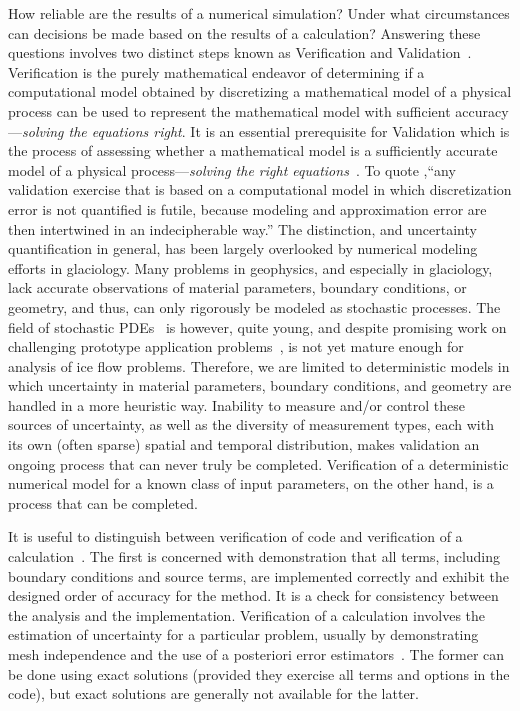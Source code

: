 How reliable are the results of a numerical simulation?
Under what circumstances can decisions be made based on the results of a calculation?
Answering these questions involves two distinct steps known as Verification and Validation~\citep{babuska2004vav,roache1998verification}.
Verification is the purely mathematical endeavor of determining if a computational model obtained by discretizing a mathematical model of a physical process can be used to represent the mathematical model with sufficient accuracy---\emph{solving the equations right}.
It is an essential prerequisite for Validation which is the process of assessing whether a mathematical model is a sufficiently accurate model of a physical process---\emph{solving the right equations}~\citep{roache1998verification}.
To quote \citet{babuska2004vav},``any validation exercise that is based on a computational model in which discretization error is not quantified is futile, because modeling and approximation error are then intertwined in an indecipherable way.''
The distinction, and uncertainty quantification in general, has been largely overlooked by numerical modeling efforts in glaciology.
Many problems in geophysics, and especially in glaciology, lack accurate observations of material parameters, boundary conditions, or geometry, and thus, can only rigorously be modeled as stochastic processes.
The field of stochastic PDEs~\citep{deb2001ssp,ghanem2003sfe,chow2007stochastic} is however, quite young, and despite promising work on challenging prototype application problems~\citep{asokan2006stochastic,ganapathysubramanian2007sgc,zabaras2008scalable,mishra2011mlmcfvm}, is not yet mature enough for analysis of ice flow problems.
Therefore, we are limited to deterministic models in which uncertainty in material parameters, boundary conditions, and geometry are handled in a more heuristic way.
Inability to measure and/or control these sources of uncertainty, as well as the diversity of measurement types, each with its own (often sparse) spatial and temporal distribution, makes validation an ongoing process that can never truly be completed.
Verification of a deterministic numerical model for a known class of input parameters, on the other hand, is a process that can be completed.

It is useful to distinguish between verification of code and verification of a calculation~\citep{roache2002cvm}.
The first is concerned with demonstration that all terms, including boundary conditions and source terms, are implemented correctly and exhibit the designed order of accuracy for the method.
It is a check for consistency between the analysis and the implementation.
Verification of a calculation involves the estimation of uncertainty for a particular problem, usually by demonstrating mesh independence and the use of a posteriori error estimators~\citep{ainsworth1997pee}.
The former can be done using exact solutions (provided they exercise all terms and options in the code), but exact solutions are generally not available for the latter.

